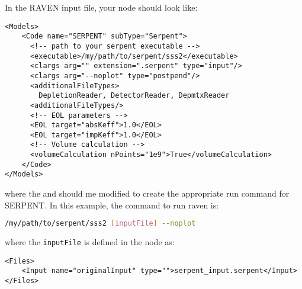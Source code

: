 In the RAVEN input file, your  node should look like:
\begin{lstlisting}[style=XML]
<Models>
    <Code name="SERPENT" subType="Serpent">
      <!-- path to your serpent executable -->
      <executable>/my/path/to/serpent/sss2</executable>
      <clargs arg="" extension=".serpent" type="input"/>
      <clargs arg="--noplot" type="postpend"/>
      <additionalFileTypes>
        DepletionReader, DetectorReader, DepmtxReader
      <additionalFileTypes/>
      <!-- EOL parameters -->
      <EOL target="absKeff">1.0</EOL>
      <EOL target="impKeff">1.0</EOL>
      <!-- Volume calculation -->
      <volumeCalculation nPoints="1e9">True</volumeCalculation>
    </Code>
</Models>
\end{lstlisting}
where the  and  should me modified
to create the appropriate run command for SERPENT. In this example, the command
to run raven is:
\begin{lstlisting}[language=bash]
/my/path/to/serpent/sss2 [inputFile] --noplot
\end{lstlisting}
where the \texttt{inputFile} is defined in the  node as:
\begin{lstlisting}[style=XML]
<Files>
    <Input name="originalInput" type="">serpent_input.serpent</Input>
</Files>
\end{lstlisting}

